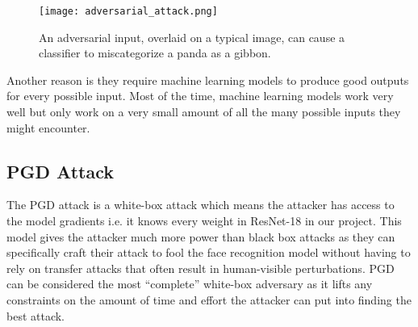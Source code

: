 \begin{figure}[h]
    \centering
    \texttt{[image: adversarial\_attack.png]}
    \caption{An adversarial input, overlaid on a typical image, can cause a classifier to miscategorize a panda as a gibbon.}
    \label{fig:adversarial_attack}
\end{figure}
    

Another reason is they require machine learning models to produce good outputs for every possible input. Most of the time, machine learning models work very well but only work on a very small amount of all the many possible inputs they might encounter. \cite{adversarial_2020}

\subsection{PGD Attack}

The PGD attack is a white-box attack which means the attacker has access to the model gradients i.e. it knows every weight in ResNet-18 in our project. This model gives the attacker much more power than black box attacks as they can specifically craft their attack to fool the face recognition model without having to rely on transfer attacks that often result in human-visible perturbations. PGD can be considered the most “complete” white-box adversary as it lifts any constraints on the amount of time and effort the attacker can put into finding the best attack. \cite{knagg_2019}
